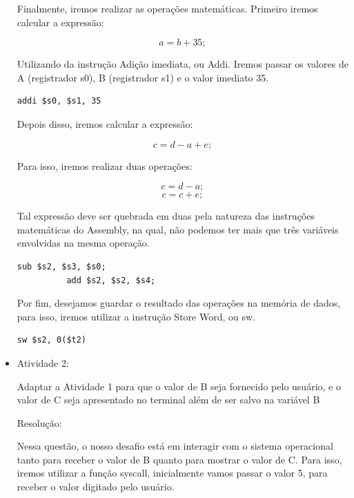 \documentclass{report}
\begin{document}
\begin{itemize}
\begin{lstlisting}[language=Ant]
\end{lstlisting}


\large

Finalmente, iremos realizar as operações matemáticas. Primeiro
iremos calcular a expressão:

$$ a = b + 35; $$ 

Utilizando da instrução Adição imediata, ou Addi. Iremos passar
os valores de A (registrador s0), B (registrador s1) e o valor
imediato 35.

\normalsize
\bigskip

\begin{lstlisting}[language=Ant]
          addi $s0, $s1, 35
\end{lstlisting}


\large

Depois disso, iremos calcular a expressão:

$$ c = d - a + e; $$ 

Para isso, iremos realizar duas operações:

$$ c = d - a; $$ 
$$ c = c + e; $$ 

Tal expressão deve ser quebrada em duas pela natureza
das instruções matemáticas do Assembly, na qual, não
podemos ter mais que três variáveis envolvidas na mesma
operação.

\normalsize
\bigskip

\begin{lstlisting}[language=Ant]
          sub $s2, $s3, $s0;
          add $s2, $s2, $s4;
\end{lstlisting}


\large

Por fim, desejamos guardar o resultado das operações na
memória de dados, para isso, iremos utilizar a instrução
Store Word, ou sw.


\normalsize
\bigskip

\begin{lstlisting}[language=Ant]
		sw $s2, 0($t2)
\end{lstlisting}

\large


   \item Atividade 2:

     Adaptar a Atividade 1 para que o valor de B seja fornecido
     pelo usuário, e o valor de C seja apresentado no terminal
     além de ser salvo na variável B
  
  \bigskip
  Resolução:
  \bigskip
  
  Nessa questão, o nosso desafio está em interagir com o sistema
  operacional tanto para receber o valor de B quanto para mostrar
  o valor de C. Para isso, iremos utilizar a função syscall,
  inicialmente vamos passar o valor 5, para receber o valor digitado
  pelo usuário.



\end{itemize}
\end{document}

